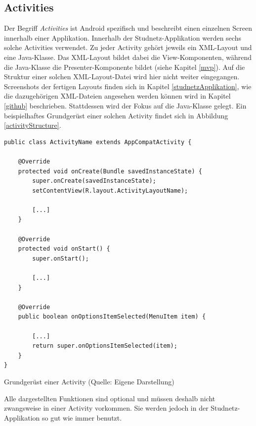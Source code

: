 \documentclass[../main.tex]{subfiles}
\begin{document}
	\subsection{Activities} \label{activities}
	Der Begriff \emph{Activities} ist Android spezifisch und beschreibt einen einzelnen Screen innerhalb einer Applikation. Innerhalb der Studnetz-Applikation werden sechs solche Activities verwendet. Zu jeder Activity gehört jeweils ein XML-Layout und eine Java-Klasse. Das XML-Layout bildet dabei die View-Komponenten, während die Java-Klasse die Presenter-Komponente bildet (siehe Kapitel \ref{mvp}). Auf die Struktur einer solchen XML-Layout-Datei wird hier nicht weiter eingegangen. Screenshots der fertigen Layouts finden sich in Kapitel \ref{studnetzApplikation}, wie die dazugehörigen XML-Dateien angesehen werden können wird in Kapitel \ref{github} beschrieben. Stattdessen wird der Fokus auf die Java-Klasse gelegt. Ein beispielhaftes Grundgerüst einer solchen Activity findet sich in Abbildung \ref{activityStructure}.
	
\begin{code}
	\begin{center}
		\begin{verbatim}
public class ActivityName extends AppCompatActivity {
			
	@Override
	protected void onCreate(Bundle savedInstanceState) {
		super.onCreate(savedInstanceState);
		setContentView(R.layout.ActivityLayoutName);
		
		[...]	
	}
	
	@Override
	protected void onStart() {
		super.onStart();
		
		[...]
	}
	
	@Override
	public boolean onOptionsItemSelected(MenuItem item) {
		
		[...]
		return super.onOptionsItemSelected(item);
	}
}	
		\end{verbatim}
		\caption{Grundgerüst einer Activity (Quelle: Eigene Darstellung)}
		\label{activityStructure}
	\end{center}
	
\end{code}

	Alle dargestellten Funktionen sind optional und müssen deshalb nicht zwangsweise in einer Activity vorkommen. Sie werden jedoch in der Studnetz-Applikation so gut wie immer benutzt.
\end{document}

